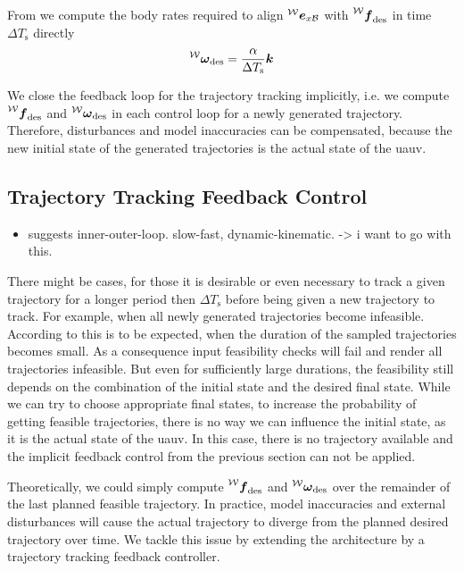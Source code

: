 From  we compute the body rates required to align $\prescript{\mathcal{W}}{}{\mbox{$\bm{e}$}}_{x\mathcal{B}}$ with $\thrustdesiredworld$ in time $\Delta T_{\text{s}}$ directly
\begin{equation}
	\vangdesiredworld = \frac{\alpha}{\Delta T_{\text{s}}} \kb
\end{equation}

We close the feedback loop for the trajectory tracking implicitly, i.e. we compute $\thrustdesiredworld$ and $\vangdesiredworld$ in each control loop for a newly generated trajectory.
Therefore, disturbances and model inaccuracies can be compensated, because the new initial state of the generated trajectories is the actual state of the \ac{uauv}.

\subsection{Trajectory Tracking Feedback Control}
\begin{itemize}
	\item \cite{Maurya09} suggests inner-outer-loop. slow-fast, dynamic-kinematic. -> i want to go with this.
\end{itemize}
There might be cases, for those it is desirable or even necessary to track a given trajectory for a longer period then $\Delta T_{\text{s}}$ before being given a new trajectory to track.
For example, when all newly generated trajectories become infeasible. According to \cite{MuellerHehn15} this is to be expected, when the duration of the sampled trajectories becomes small.
As a consequence input feasibility checks will fail and render all trajectories infeasible.
But even for sufficiently large durations, the feasibility still depends on the combination of the initial state and the desired final state.
While we can try to choose appropriate final states, to increase the probability of getting feasible trajectories, there is no way we can influence the initial state, as it is the actual state of the \ac{uauv}.
In this case, there is no trajectory available and the implicit feedback control from the previous section can not be applied.

Theoretically, we could simply compute $\thrustdesiredworld$ and $\vangdesiredworld$ over the remainder of the last planned feasible trajectory.
In practice, model inaccuracies and external disturbances will cause the actual trajectory to diverge from the planned desired trajectory over time.
We tackle this issue by extending the architecture by a trajectory tracking feedback controller.

